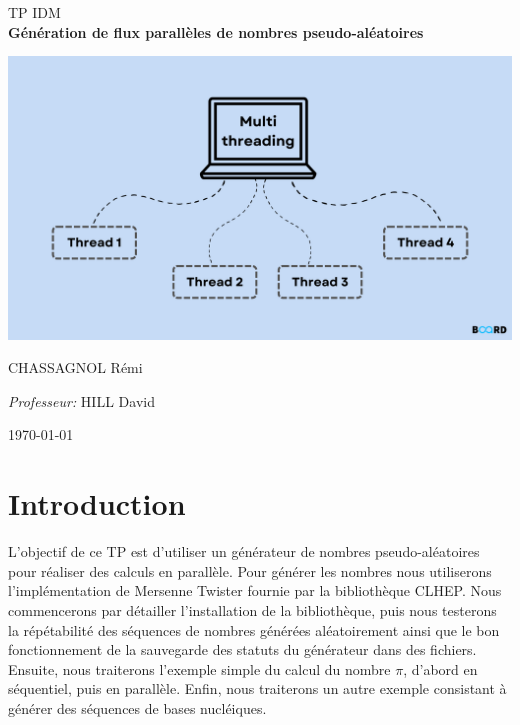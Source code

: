 \documentclass[a4paper]{article}
\begin{document}
\begin{titlepage}
\begin{center}

    \textsc{\LARGE TP IDM}\\[0.5cm]

    {\huge \bfseries Génération de flux parallèles de nombres pseudo-aléatoires\\[3cm]}

      \centering
      \includegraphics[scale=0.3]{./img/banner.png}

      \vspace*{\fill}

    \begin{multicols}{2}
      \large
      CHASSAGNOL Rémi\\

      \columnbreak

      \large
      \emph{Professeur:} HILL David\\
    \end{multicols}

    \textsc{\today}

  \end{center}
\end{titlepage}

\clearpage
\tableofcontents
\listoflistings
\clearpage

\section{Introduction}

L'objectif de ce TP est d'utiliser un générateur de nombres pseudo-aléatoires
pour réaliser des calculs en parallèle. Pour générer les nombres nous
utiliserons l'implémentation de Mersenne Twister fournie par la bibliothèque
CLHEP. Nous commencerons par détailler l'installation de la bibliothèque, puis
nous testerons la répétabilité des séquences de nombres générées aléatoirement
ainsi que le bon fonctionnement de la sauvegarde des statuts du générateur dans
des fichiers. Ensuite, nous traiterons l'exemple simple du calcul du nombre
$\pi$, d'abord en séquentiel, puis en parallèle. Enfin, nous traiterons un autre
exemple consistant à générer des séquences de bases nucléiques.\\
\end{document}
